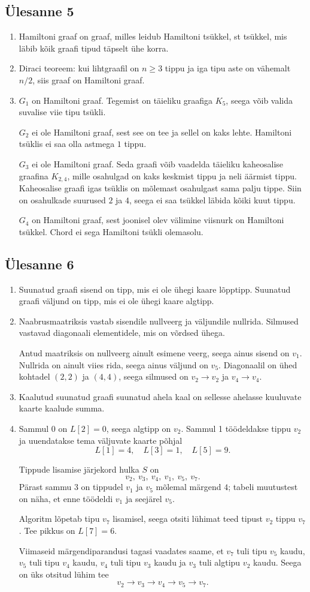 \documentclass[11pt,a4paper]{article}
\newcommand{\yl}[1]{\subsection*{Ülesanne #1}}
\begin{document}
\yl{5}
\begin{enumerate}[label=\alph*.]
\item Hamiltoni graaf on graaf, milles leidub Hamiltoni tsükkel, st tsükkel, mis läbib kõik graafi tipud täpselt ühe korra.
\item Diraci teoreem: kui lihtgraafil on $n\ge 3$ tippu ja iga tipu aste on vähemalt $n/2$, siis graaf on Hamiltoni graaf.
\item $G_1$ on Hamiltoni graaf. Tegemist on täieliku graafiga $K_5$, seega võib valida suvalise viie tipu tsükli.

$G_2$ ei ole Hamiltoni graaf, sest see on tee ja sellel on kaks lehte. Hamiltoni tsüklis ei saa olla astmega $1$ tippu.

$G_3$ ei ole Hamiltoni graaf. Seda graafi võib vaadelda täieliku kaheosalise graafina $K_{2,4}$, mille osahulgad on kaks keskmist tippu ja neli äärmist tippu. Kaheosalise graafi igas tsüklis on mõlemast osahulgast sama palju tippe. Siin on osahulkade suurused $2$ ja $4$, seega ei saa tsükkel läbida kõiki kuut tippu.

$G_4$ on Hamiltoni graaf, sest joonisel olev välimine viisnurk on Hamiltoni tsükkel. Chord ei sega Hamiltoni tsükli olemasolu.
\end{enumerate}

\yl{6}
\begin{enumerate}[label=\alph*.]
\item Suunatud graafi sisend on tipp, mis ei ole ühegi kaare lõpptipp. Suunatud graafi väljund on tipp, mis ei ole ühegi kaare algtipp.
\item Naabrusmaatriksis vastab sisendile nullveerg ja väljundile nullrida. Silmused vastavad diagonaali elementidele, mis on võrdsed ühega.

Antud maatriksis on nullveerg ainult esimene veerg, seega ainus sisend on $v_1$. Nullrida on ainult viies rida, seega ainus väljund on $v_5$. Diagonaalil on ühed kohtadel $(2,2)$ ja $(4,4)$, seega silmused on $v_2\to v_2$ ja $v_4\to v_4$.
\item Kaalutud suunatud graafi suunatud ahela kaal on sellesse ahelasse kuuluvate kaarte kaalude summa.
\item Sammul 0 on $L[2]=0$, seega algtipp on $v_2$. Sammul 1 töödeldakse tippu $v_2$ ja uuendatakse tema väljuvate kaarte põhjal
\[
L[1]=4,
\quad L[3]=1,
\quad L[5]=9.
\]

Tippude lisamise järjekord hulka $S$ on
\[
v_2,
\ v_3,
\ v_4,
\ v_1,
\ v_5,
\ v_7.
\]
Pärast sammu 3 on tippudel $v_1$ ja $v_5$ mõlemal märgend $4$; tabeli muutustest on näha, et enne töödeldi $v_1$ ja seejärel $v_5$.

Algoritm lõpetab tipu $v_7$ lisamisel, seega otsiti lühimat teed tipust $v_2$ tippu $v_7$. Tee pikkus on $L[7]=6$.

Viimaseid märgendiparandusi tagasi vaadates saame, et $v_7$ tuli tipu $v_5$ kaudu, $v_5$ tuli tipu $v_4$ kaudu, $v_4$ tuli tipu $v_3$ kaudu ja $v_3$ tuli algtipu $v_2$ kaudu. Seega on üks otsitud lühim tee
\[
v_2\to v_3\to v_4\to v_5\to v_7.
\]
\end{enumerate}
\end{document}
